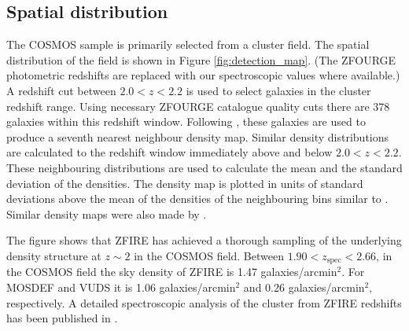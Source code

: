 \documentclass[iop]{emulateapj}
\begin{document}
\subsection{Spatial distribution}
\label{sec:spatial}

The COSMOS sample is primarily selected from a cluster field. The spatial distribution of the  field is shown in Figure \ref{fig:detection_map}. 
(The ZFOURGE photometric redshifts are replaced with our spectroscopic values where available.)  A redshift cut between $2.0<z<2.2$ is used to select galaxies in the cluster redshift range. 
Using necessary ZFOURGE catalogue quality cuts there are  378 galaxies within this redshift window.
Following \citet{Spitler2012}, these galaxies are used to produce a seventh nearest neighbour density map.
Similar density distributions are calculated to the redshift window immediately above and below $2.0<z<2.2$. These neighbouring distributions are used to  calculate the mean and the standard deviation of the densities. The density map is plotted in units of standard deviations above the mean of the densities of the neighbouring bins similar to \citet{Spitler2012}. Similar density maps were also made by \citet{Allen2015}. 


The figure shows that ZFIRE has achieved a thorough sampling of the underlying density
structure at $z\sim2$ in the COSMOS field.  Between
$1.90<z_\mathrm{spec}<2.66$, in the COSMOS field the sky density of
ZFIRE is 1.47 galaxies/arcmin$^2$. For MOSDEF and VUDS it is 1.06
galaxies/arcmin$^2$ and 0.26 galaxies/arcmin$^2$, respectively.  A
detailed spectroscopic analysis of the cluster from
ZFIRE redshifts has been published in  \citet{Yuan2014}.
\end{document}
